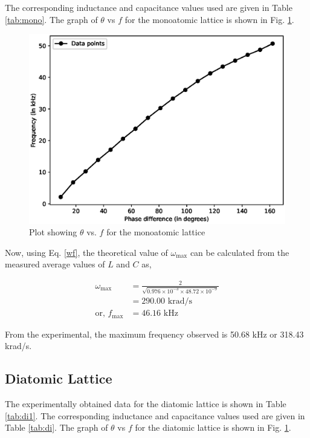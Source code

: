 The corresponding inductance and capacitance values used are given in Table \ref{tab:mono}. The graph of $\theta$ vs $f$ for the monoatomic lattice is shown in Fig. \ref{g1}.



\begin{figure}
    \centering
    \includegraphics[width=1\columnwidth]{images/mono.eps}
    \caption{Plot showing $\theta$ vs. $f$ for the monoatomic lattice}
    \label{g1}
\end{figure}

Now, using Eq. \ref{wf}, the theoretical value of $\omega_\text{max}$ can be calculated from the measured average values of $L$ and $C$ as,

\begin{align*}
    \omega_\text{max} &= \frac{2}{\sqrt{0.976 \times 10^{-3} \times 48.72 \times 10^{-9}}}\\ &= 290.00 \text{ krad/s}\\ \text{or, }f_\text{max} &= 46.16 \text{ kHz}
\end{align*}

From the experimental, the maximum frequency observed is 50.68 kHz or 318.43 krad/s.

\subsection{Diatomic Lattice}
The experimentally obtained data for the diatomic
lattice is shown in Table \ref{tab:di1}. The corresponding inductance and capacitance values used are given in Table \ref{tab:di}. The graph of $\theta$ vs $f$ for the diatomic lattice is shown in Fig. \ref{g1}.



